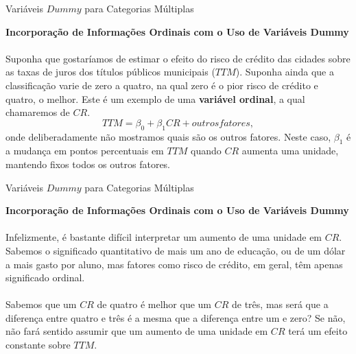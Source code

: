 \documentclass[t,14pt,mathserif]{beamer}
\begin{document}
{
\begin{frame}{Variáveis $Dummy$ para Categorias Múltiplas}
		\begin{tcolorbox}
			\indent\textbf{\small{Incorporação de Informações Ordinais com o Uso de Variáveis Dummy}}\\ 
			\\ \footnotesize{Suponha que gostaríamos de estimar o efeito do risco de crédito das cidades sobre as taxas de juros dos títulos públicos municipais ($TTM$). Suponha ainda que a classificação varie de zero a quatro, na qual zero é o pior risco de crédito e quatro, o melhor. Este é um exemplo de uma \textbf{variável ordinal}, a qual chamaremos de $CR$}.
			\begin{equation}
			TTM = \beta_{0} + \beta_{1}CR + outros fatores,\label{eq1}\nonumber
			\end{equation}
		   \footnotesize{onde deliberadamente não mostramos quais são os outros fatores. Neste caso, $\beta_{1}$ é a mudança em pontos percentuais em $TTM$ quando $CR$ aumenta uma unidade, mantendo fixos todos os outros fatores.}
			
		\end{tcolorbox}
       
\end{frame}
}
 
{
\begin{frame}{Variáveis $Dummy$ para Categorias Múltiplas}
		\begin{tcolorbox}
			\indent\textbf{\small{Incorporação de Informações Ordinais com o Uso de Variáveis Dummy}}\\ 
			\\ \footnotesize{Infelizmente, é bastante difícil interpretar um aumento de uma unidade em $CR$. Sabemos o significado quantitativo de mais um ano de educação, ou de um dólar a mais gasto por aluno, mas fatores como risco de crédito, em geral, têm apenas significado ordinal.}\\
		  \\ \footnotesize{Sabemos que um  $CR$ de quatro é melhor que um $CR$ de três, mas será que a diferença entre quatro e três é a mesma que a diferença entre um e zero? Se não, não fará sentido assumir que um aumento de uma unidade em $CR$ terá um efeito constante sobre $TTM$.}\\
	
		\end{tcolorbox}
       
\end{frame}
} 
\end{document}
